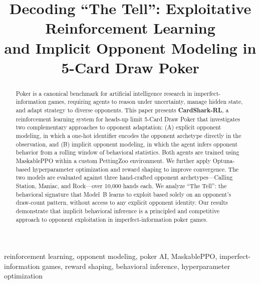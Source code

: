 \documentclass[conference]{IEEEtran}
\begin{document}
\title{Decoding ``The Tell'': Exploitative Reinforcement Learning\\
and Implicit Opponent Modeling in 5-Card Draw Poker}

\author{
}

\maketitle

\begin{abstract}
Poker is a canonical benchmark for artificial intelligence research in
imperfect-information games, requiring agents to reason under
uncertainty, manage hidden state, and adapt strategy to diverse
opponents. This paper presents \textbf{CardShark-RL}, a reinforcement
learning system for heads-up limit 5-Card Draw Poker that investigates
two complementary approaches to opponent adaptation: (A) explicit
opponent modeling, in which a one-hot identifier encodes the opponent
archetype directly in the observation, and (B) implicit opponent
modeling, in which the agent infers opponent behavior from a rolling
window of behavioral statistics. Both agents are trained using
MaskablePPO \cite{raffin2021stable} within a custom PettingZoo
\cite{terry2021pettingzoo} environment. We further apply Optuna-based
hyperparameter optimization \cite{akiba2019optuna} and reward shaping
to improve convergence. The two models are evaluated against three
hand-crafted opponent archetypes---Calling Station, Maniac, and
Rock---over 10,000 hands each. We analyze ``The Tell'': the behavioral
signature that Model~B learns to exploit based solely on an opponent's
draw-count pattern, without access to any explicit opponent identity.
Our results demonstrate that implicit behavioral inference is a
principled and competitive approach to opponent exploitation in
imperfect-information poker games.
\end{abstract}

\begin{IEEEkeywords}
reinforcement learning, opponent modeling, poker AI, MaskablePPO,
imperfect-information games, reward shaping, behavioral inference,
hyperparameter optimization
\end{IEEEkeywords}
\end{document}
